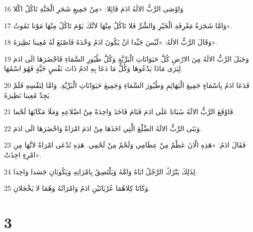 \par 16 وَاوْصَى الرَّبُّ الالَهُ ادَمَ قَائِلا: «مِنْ جَمِيعِ شَجَرِ الْجَنَّةِ تَاكُلُ اكْلا
\par 17 وَامَّا شَجَرَةُ مَعْرِفَةِ الْخَيْرِ وَالشَّرِّ فَلا تَاكُلْ مِنْهَا لانَّكَ يَوْمَ تَاكُلُ مِنْهَا مَوْتا تَمُوتُ».
\par 18 وَقَالَ الرَّبُّ الالَهُ: «لَيْسَ جَيِّدا انْ يَكُونَ ادَمُ وَحْدَهُ فَاصْنَعَ لَهُ مُعِينا نَظِيرَهُ».
\par 19 وَجَبَلَ الرَّبُّ الالَهُ مِنَ الارْضِ كُلَّ حَيَوَانَاتِ الْبَرِّيَّةِ وَكُلَّ طُيُورِ السَّمَاءِ فَاحْضَرَهَا الَى ادَمَ لِيَرَى مَاذَا يَدْعُوهَا وَكُلُّ مَا دَعَا بِهِ ادَمُ ذَاتَ نَفْسٍ حَيَّةٍ فَهُوَ اسْمُهَا.
\par 20 فَدَعَا ادَمُ بِاسْمَاءٍ جَمِيعَ الْبَهَائِمِ وَطُيُورَ السَّمَاءِ وَجَمِيعَ حَيَوَانَاتِ الْبَرِّيَّةِ. وَامَّا لِنَفْسِهِ فَلَمْ يَجِدْ مُعِينا نَظِيرَهُ.
\par 21 فَاوْقَعَ الرَّبُّ الالَهُ سُبَاتا عَلَى ادَمَ فَنَامَ فَاخَذَ وَاحِدَةً مِنْ اضْلاعِهِ وَمَلَا مَكَانَهَا لَحْما.
\par 22 وَبَنَى الرَّبُّ الالَهُ الضِّلْعَ الَّتِي اخَذَهَا مِنْ ادَمَ امْرَاةً وَاحْضَرَهَا الَى ادَمَ.
\par 23 فَقَالَ ادَمُ: «هَذِهِ الْانَ عَظْمٌ مِنْ عِظَامِي وَلَحْمٌ مِنْ لَحْمِي. هَذِهِ تُدْعَى امْرَاةً لانَّهَا مِنِ امْرِءٍ اخِذَتْ».
\par 24 لِذَلِكَ يَتْرُكُ الرَّجُلُ ابَاهُ وَامَّهُ وَيَلْتَصِقُ بِامْرَاتِهِ وَيَكُونَانِ جَسَدا وَاحِدا.
\par 25 وَكَانَا كِلاهُمَا عُرْيَانَيْنِ ادَمُ وَامْرَاتُهُ وَهُمَا لا يَخْجَلانِ.

\chapter{3}

